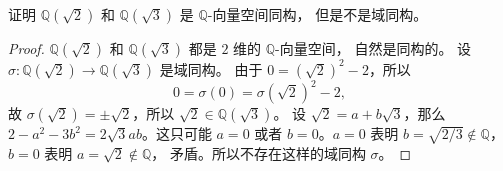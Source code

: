 \begin{problem}
  证明 $\mathbb{Q}(\sqrt{2})$ 和 $\mathbb{Q}(\sqrt{3})$ 是 $\mathbb{Q}$-向量空间同构，
  但是不是域同构。
\end{problem}
\begin{proof}
  $\mathbb{Q}(\sqrt{2})$ 和 $\mathbb{Q}(\sqrt{3})$ 都是 $2$ 维的 $\mathbb{Q}$-向量空间，
  自然是同构的。
  设 $\sigma:\mathbb{Q}(\sqrt{2})\to \mathbb{Q}(\sqrt{3})$ 是域同构。
  由于 $0=(\sqrt{2})^2-2$，所以 
  \[
    0=\sigma(0)=\sigma(\sqrt{2})^2-2,
  \]
  故 $\sigma(\sqrt{2})=\pm\sqrt{2}$，所以 $\sqrt{2}\in \mathbb{Q}(\sqrt{3})$。
  设 $\sqrt{2}=a+b\sqrt{3}$，那么 $2-a^2-3b^2=2\sqrt{3}ab$。这只可能 $a=0$ 或者
  $b=0$。$a=0$ 表明 $b=\sqrt{2/3}\notin \mathbb{Q}$，$b=0$ 表明 $a=\sqrt{2}\notin \mathbb{Q}$，
  矛盾。所以不存在这样的域同构 $\sigma$。
\end{proof}






